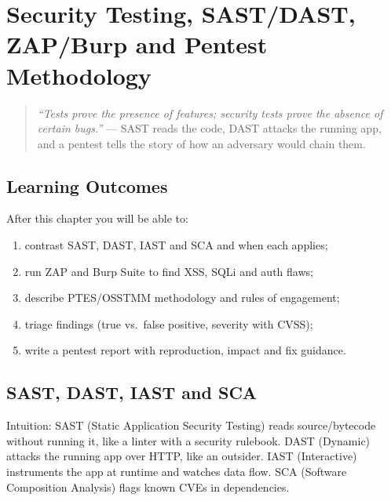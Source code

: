 \chapter{Security Testing, SAST/DAST, ZAP/Burp and Pentest Methodology}
\label{ch:testing}

\begin{quote}
\emph{``Tests prove the presence of features; security tests prove the absence of certain bugs.''} --- SAST reads the code, DAST attacks the running app, and a pentest tells the story of how an adversary would chain them.
\end{quote}

\noindent{}
\vspace{0.4em}

\section*{Learning Outcomes}
After this chapter you will be able to:
\begin{enumerate}[label=(L\arabic*)]
    \item contrast SAST, DAST, IAST and SCA and when each applies;
    \item run ZAP and Burp Suite to find XSS, SQLi and auth flaws;
    \item describe PTES/OSSTMM methodology and rules of engagement;
    \item triage findings (true vs.\ false positive, severity with CVSS);
    \item write a pentest report with reproduction, impact and fix guidance.
\end{enumerate}

\section{SAST, DAST, IAST and SCA}
\label{sec:sast-dast}
Intuition: SAST (Static Application Security Testing) reads source/bytecode without running it, like a linter with a security rulebook. DAST (Dynamic) attacks the running app over HTTP, like an outsider. IAST (Interactive) instruments the app at runtime and watches data flow. SCA (Software Composition Analysis) flags known CVEs in dependencies.


